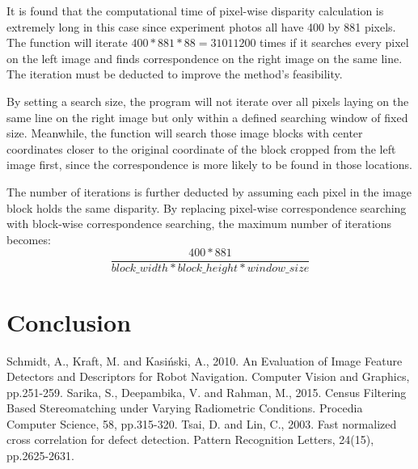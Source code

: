 \documentclass[conference]{IEEEtran}
\begin{document}
It is found that the computational time of pixel-wise disparity calculation is extremely long in this case since experiment photos all have 400 by 881 pixels. The function will iterate $400*881*88=31011200$ times if it searches every pixel on the left image and finds correspondence on the right image on the same line. The iteration must be deducted to improve the method's feasibility.

By setting a search size, the program will not iterate over all pixels laying on the same line on the right image but only within a defined searching window of fixed size. Meanwhile, the function will search those image blocks with center coordinates closer to the original coordinate of the block cropped from the left image first, since the correspondence is more likely to be found in those locations.

The number of iterations is further deducted by assuming each pixel in the image block holds the same disparity. By replacing pixel-wise correspondence searching with block-wise correspondence searching, the maximum number of iterations becomes:
\begin{equation*}
    \frac{400*881}{block\_width*block\_height*window\_size}
\end{equation*}

\section{Conclusion}

\newpage
\begin{thebibliography}{00}
 Schmidt, A., Kraft, M. and Kasiński, A., 2010. An Evaluation of Image Feature Detectors and Descriptors for Robot Navigation. Computer Vision and Graphics, pp.251-259.
 Sarika, S., Deepambika, V. and Rahman, M., 2015. Census Filtering Based Stereomatching under Varying Radiometric Conditions. Procedia Computer Science, 58, pp.315-320.
 Tsai, D. and Lin, C., 2003. Fast normalized cross correlation for defect detection. Pattern Recognition Letters, 24(15), pp.2625-2631.
\end{thebibliography}
\vspace{12pt}
\end{document}

